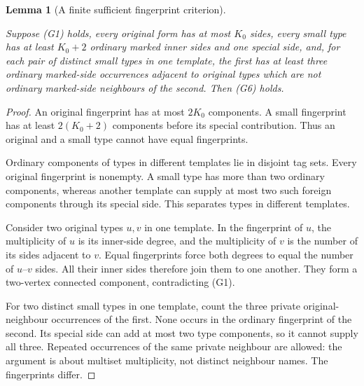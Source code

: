 \documentclass[11pt,a4paper]{article}
\newtheorem{lemma}[definition]{Lemma}
\theoremstyle{remark}
\newcommand{\lean}[1]{}
\newcommand{\uses}[1]{}
\begin{document}
\begin{lemma}[A finite sufficient fingerprint criterion]
\label{lem:fingerprint}
\lean{Tilings.Geometry.fingerprintSeparation}
\uses{def:certificate,lem:quantitative-sector}
Suppose (G1) holds, every original form has at most $K_0$ sides, every small
type has at least $K_0+2$ ordinary marked inner sides and one special side,
and, for each pair of distinct small types in one template, the first has
at least three ordinary marked-side occurrences adjacent to original
types which are not ordinary marked-side neighbours of the second.
Then (G6) holds.
\end{lemma}

\begin{proof}
An original fingerprint has at most $2K_0$ components.  A small fingerprint
has at least $2(K_0+2)$ components before its special contribution.  Thus
an original and a small type cannot have equal fingerprints.

Ordinary components of types in different templates lie in disjoint tag
sets.  Every original fingerprint is nonempty.  A small type has more
than two ordinary components, whereas another template can supply at most
two such foreign components through its special side.  This separates
types in different templates.

Consider two original types $u,v$ in one template.  In the fingerprint of
$u$, the multiplicity of $u$ is its inner-side degree, and the multiplicity
of $v$ is the number of its sides adjacent to $v$.  Equal fingerprints
force both degrees to equal the number of $u$--$v$ sides.  All their inner
sides therefore join them to one another.  They form a two-vertex connected
component, contradicting (G1).

For two distinct small types in one template, count the three private
original-neighbour occurrences of the first.  None occurs in the ordinary
fingerprint of the second.  Its special side can add at most two type
components, so it cannot supply all three.  Repeated occurrences of the
same private neighbour are allowed: the argument is about multiset
multiplicity, not distinct neighbour names.  The fingerprints differ.
\end{proof}
\end{document}
